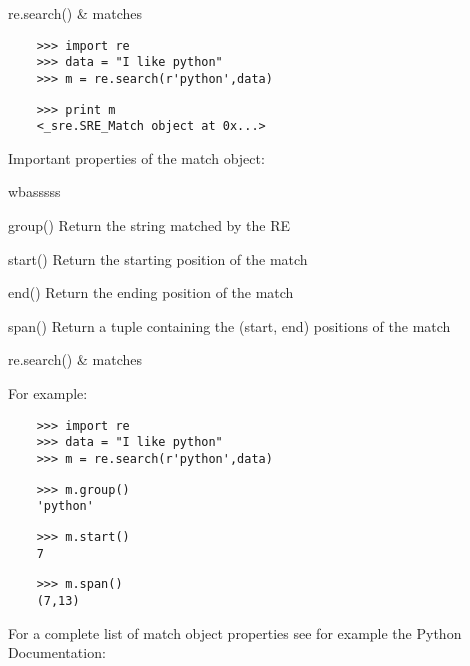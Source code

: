 \begin{frame}[fragile]{re.search() \& matches}

  \begin{verbatim}
    >>> import re
    >>> data = "I like python"
    >>> m = re.search(r'python',data)
  \end{verbatim}
  \pause
  \vspace{-10pt}
  \begin{verbatim}
    >>> print m
    <_sre.SRE_Match object at 0x...>
  \end{verbatim}
  \pause
  \vspace{0.7cm}
  Important properties of the match object:
  
  \begin{adjustwidth}{0.6cm}{0pt}
    \medskip
    \begin{mydescription}{wbasssss}
      \itemsep6pt
      \item[group()] Return the string matched by the RE
      \item[start()] Return the starting position of the match
      \item[end()] Return the ending position of the match
      \item[span()] Return a tuple containing the (start, end) positions of the match
    \end{mydescription}
  \end{adjustwidth}
  
\end{frame}


\begin{frame}[fragile]{re.search() \& matches}

  For example:

  \bigskip

  \begin{verbatim}
    >>> import re
    >>> data = "I like python"
    >>> m = re.search(r'python',data)
  \end{verbatim}
  \pause
  \vspace{-10pt}
  \begin{verbatim}
    >>> m.group()
    'python'
  \end{verbatim}
  \pause
  \vspace{-10pt}
  \begin{verbatim}  
    >>> m.start()
    7
  \end{verbatim}
  \pause
  \vspace{-10pt}
  \begin{verbatim} 
    >>> m.span()
    (7,13)
  \end{verbatim}

  \bigskip

  For a complete list of match object properties see for example the
  Python Documentation:

  \smallskip  

  \small {}

\end{frame}


